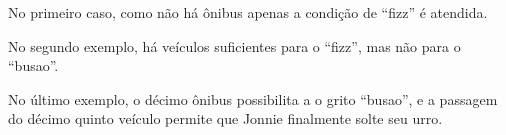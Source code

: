 No primeiro caso, como não há ônibus apenas a condição de ``fizz'' é atendida.

No segundo exemplo, há veículos suficientes para o ``fizz'', mas não para o ``busao''.

No último exemplo, o décimo ônibus possibilita a o grito ``busao'', e a passagem do décimo quinto veículo permite que Jonnie finalmente solte seu urro.
